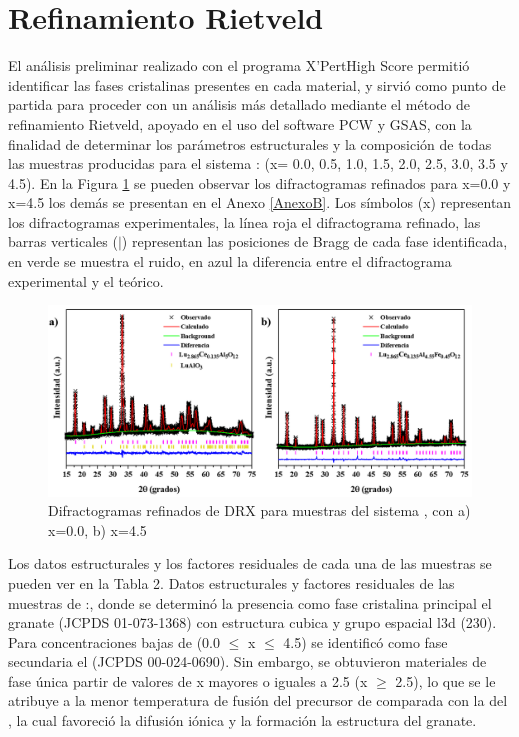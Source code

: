 \section{Refinamiento Rietveld}

El análisis preliminar realizado con el programa X’Pert\textregistered High
Score permitió
identificar las fases cristalinas presentes en cada material, y sirvió como
punto de partida para proceder con un análisis más detallado mediante el método
de refinamiento Rietveld, apoyado en el uso del software PCW y GSAS, con la
finalidad de determinar los parámetros estructurales y la composición de todas
las muestras producidas para el sistema :
(x= 0.0, 0.5, 1.0, 1.5, 2.0, 2.5, 3.0, 3.5 y 4.5). En la Figura \ref{fig:refi}
se pueden observar los difractogramas refinados para x=0.0 y x=4.5 los demás se
presentan en el Anexo \ref{AnexoB}. Los símbolos (x) representan los difractogramas 
experimentales, la línea roja el difractograma refinado, las barras verticales ($\mid$)
representan las posiciones de Bragg de cada fase identificada, en verde se
muestra el ruido, en azul la diferencia entre el difractograma experimental y el
teórico.\\

\begin{figure}[h]
    \centering%

    \includegraphics[width=\textwidth]{Kap3/Refinamiento.png}%
    \caption{Difractogramas refinados de DRX para muestras del sistema
    , con a) x=0.0, b) x=4.5} \label{fig:refi}
\end{figure}

Los datos estructurales y los factores residuales de cada una de las muestras
se pueden ver en la Tabla 2. Datos estructurales y factores residuales de las
muestras de :, donde se determinó la
presencia como fase cristalina principal el granate  (JCPDS
01-073-1368) con estructura cubica y grupo espacial l3d (230). Para
concentraciones bajas de  (0.0 $\leq$ x $\leq$ 4.5) se identificó
como
fase secundaria el  (JCPDS 00-024-0690). Sin embargo, se obtuvieron
materiales de fase única partir de valores de x mayores o iguales a 2.5 (x
$\geq$ 2.5), lo que se le atribuye a la menor temperatura de fusión del
precursor de  comparada con la del , la cual favoreció
la difusión iónica y la formación la estructura del granate.\\

